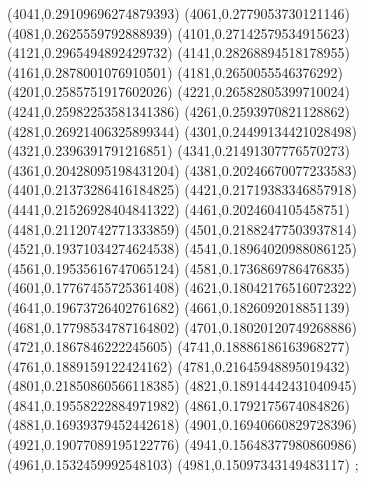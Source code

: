 {(4041,0.29109696274879393)
(4061,0.2779053730121146)
(4081,0.2625559792888939)
(4101,0.27142579534915623)
(4121,0.2965494892429732)
(4141,0.28268894518178955)
(4161,0.2878001076910501)
(4181,0.2650055546376292)
(4201,0.2585751917602026)
(4221,0.26582805399710024)
(4241,0.25982253581341386)
(4261,0.2593970821128862)
(4281,0.26921406325899344)
(4301,0.24499134421028498)
(4321,0.2396391791216851)
(4341,0.21491307776570273)
(4361,0.20428095198431204)
(4381,0.20246670077233583)
(4401,0.21373286416184825)
(4421,0.21719383346857918)
(4441,0.21526928404841322)
(4461,0.2024604105458751)
(4481,0.21120742771333859)
(4501,0.21882477503937814)
(4521,0.19371034274624538)
(4541,0.18964020988086125)
(4561,0.19535616747065124)
(4581,0.1736869786476835)
(4601,0.17767455725361408)
(4621,0.18042176516072322)
(4641,0.19673726402761682)
(4661,0.1826092018851139)
(4681,0.17798534787164802)
(4701,0.18020120749268886)
(4721,0.1867846222245605)
(4741,0.18886186163968277)
(4761,0.1889159122424162)
(4781,0.21645948895019432)
(4801,0.21850860566118385)
(4821,0.18914442431040945)
(4841,0.19558222884971982)
(4861,0.1792175674084826)
(4881,0.16939379452442618)
(4901,0.16940660829728396)
(4921,0.19077089195122776)
(4941,0.15648377980860986)
(4961,0.1532459992548103)
(4981,0.15097343149483117)
};
